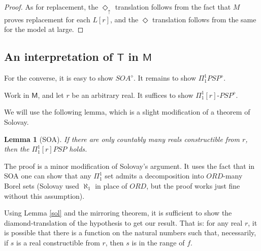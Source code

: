 \documentclass{article}
\newtheorem{Lemma}[Theorem]{Lemma}
\theoremstyle{definition}
\newcommand{\du}{\Diamond_\uparrow}
\begin{document}
\begin{proof}
    As for replacement, the $\du$ translation follows from the fact that $M$ proves replacement for 
    each $L[r]$, and the $\Diamond$ translation follows from the same for the model at large.
    

\end{proof}


\subsection{An interpretation of $\mathsf{T}$ in $\mathsf{M}$}
For the converse, it is easy to show $SOA^\diamond$. 
It remains to show $\Pi^1_1 PSP^\diamond$. 

Work in $\mathsf{M}$, and let $r$ be an arbitrary real. It suffices to show
$\Pi_1^1[r]$-$PSP^\diamond$. 

We will use the following lemma, which is a slight modification of a theorem of Solovay.
\begin{Lemma}[SOA]\label{sol}
    If there are only countably many reals constructible from $r$, then the $\Pi_1^1[r] PSP$ holds.
\end{Lemma}
The proof is a minor modification of Solovay's argument. It uses the fact that in SOA one can show 
that any $\Pi_1^1$ set admits a decomposition into $ORD$-many Borel sets (Solovay used $\aleph_1$ 
in place of $ORD$, but the proof works just fine without this assumption). 

Using Lemma \eqref{sol} and the mirroring theorem, it is sufficient to show the diamond-translation 
of the hypothesis to get our result. That is: for any real $r$, it is possible that 
there is a function on the natural numbers such that, 
necessarily, if $s$ is a real constructible from $r$, then $s$ is in the range of $f$.
\end{document}
